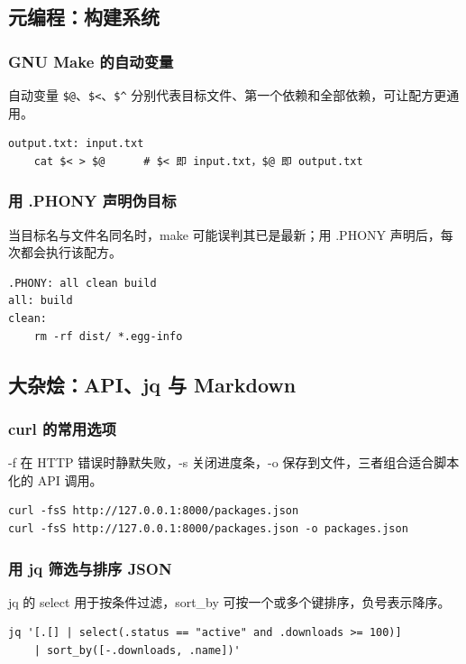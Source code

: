 \subsection{元编程：构建系统}

\subsubsection{GNU Make 的自动变量}
自动变量 \verb|$@|、\verb|$<|、\verb|$^| 分别代表目标文件、第一个依赖和全部依赖，可让配方更通用。
\begin{verbatim}
output.txt: input.txt
	cat $< > $@      # $< 即 input.txt，$@ 即 output.txt
\end{verbatim}

\subsubsection{用 .PHONY 声明伪目标}
当目标名与文件名同名时，make 可能误判其已是最新；用 .PHONY 声明后，每次都会执行该配方。
\begin{verbatim}
.PHONY: all clean build
all: build
clean:
	rm -rf dist/ *.egg-info
\end{verbatim}

\subsection{大杂烩：API、jq 与 Markdown}

\subsubsection{curl 的常用选项}
-f 在 HTTP 错误时静默失败，-s 关闭进度条，-o 保存到文件，三者组合适合脚本化的 API 调用。
\begin{verbatim}
curl -fsS http://127.0.0.1:8000/packages.json
curl -fsS http://127.0.0.1:8000/packages.json -o packages.json
\end{verbatim}

\subsubsection{用 jq 筛选与排序 JSON}
jq 的 select 用于按条件过滤，sort\_by 可按一个或多个键排序，负号表示降序。
\begin{verbatim}
jq '[.[] | select(.status == "active" and .downloads >= 100)]
    | sort_by([-.downloads, .name])'
\end{verbatim}

